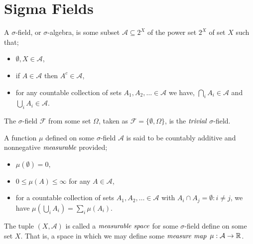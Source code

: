 
\section{Sigma Fields}
\label{sec:sigma-fields}

\begin{defn}
	A $\sigma$-field, or $\sigma$-algebra, is some
	subset $\mathcal{A} \subseteq 2^{X}$ of the power set
	$2^{X}$ of set $X$ such that;
	\begin{itemize}
		\item $\emptyset, X \in \mathcal{A}$,
		\item if $A \in \mathcal{A}$ then $A^c \in \mathcal{A}$,
		\item for any countable collection of sets
			$A_1, A_2, \dots \in \mathcal{A}$ we have,
			$\displaystyle \bigcap_{i} A_i \in \mathcal{A}$ and
			$\displaystyle \bigcup_{i} A_i \in \mathcal{A}$.
	\end{itemize}
\end{defn}

\begin{lem}
	The $\sigma$-field $\mathcal{F}$ from some set $\Omega$, taken as
	$\mathcal{F} = \{ \emptyset, \Omega \}$, is the
	$\emph{trivial}$ $\sigma$-field.
\end{lem}

\begin{defn}[Measure]
	A function $\mu$ defined on some $\sigma$-field $\mathcal{A}$
	is said to be countably additive and nonnegative $\emph{measurable}$
	provided;
	\begin{itemize}
		\item $\mu (\emptyset) = 0$,
		\item $0 \leq \mu (A) \leq \infty$ for any $A \in \mathcal{A}$,
		\item for a countable collection of sets
			$A_1, A_2, \dots \in \mathcal{A}$ with
			$A_i \cap A_j = \emptyset : i \neq j$, we have
			$\displaystyle \mu \left( \bigcup_i A_i \right) = \sum_i \mu (A_i)$.
	\end{itemize}
\end{defn}

\begin{defn}
	The tuple $(X, \mathcal{A})$ is called a $\emph{measurable space}$
	for some $\sigma$-field define on some set $X$.
	That is, a space in which we may define some $\emph{measure map}$
	$\mu: \mathcal{A} \to \mathbb{R}$.
\end{defn}

